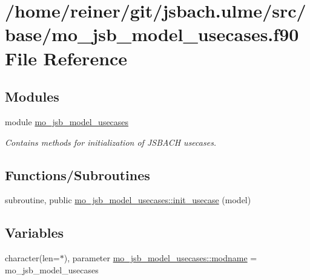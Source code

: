\hypertarget{mo__jsb__model__usecases_8f90}{}\section{/home/reiner/git/jsbach.ulme/src/base/mo\+\_\+jsb\+\_\+model\+\_\+usecases.f90 File Reference}
\label{mo__jsb__model__usecases_8f90}
\subsection*{Modules}
\begin{DoxyCompactItemize}
\item 
module \hyperlink{namespacemo__jsb__model__usecases}{mo\+\_\+jsb\+\_\+model\+\_\+usecases}
\begin{DoxyCompactList}\small\item\em Contains methods for initialization of J\+S\+B\+A\+C\+H usecases. \end{DoxyCompactList}\end{DoxyCompactItemize}
\subsection*{Functions/\+Subroutines}
\begin{DoxyCompactItemize}
\item 
subroutine, public \hyperlink{namespacemo__jsb__model__usecases_aee8b30e4af60fbe54276c99ea4ee1fd1}{mo\+\_\+jsb\+\_\+model\+\_\+usecases\+::init\+\_\+usecase} (model)
\end{DoxyCompactItemize}
\subsection*{Variables}
\begin{DoxyCompactItemize}
\item 
character(len=$\ast$), parameter \hyperlink{namespacemo__jsb__model__usecases_a6402d6a009193765fce1700ae3c98365}{mo\+\_\+jsb\+\_\+model\+\_\+usecases\+::modname} = \textquotesingle{}mo\+\_\+jsb\+\_\+model\+\_\+usecases\textquotesingle{}
\end{DoxyCompactItemize}
